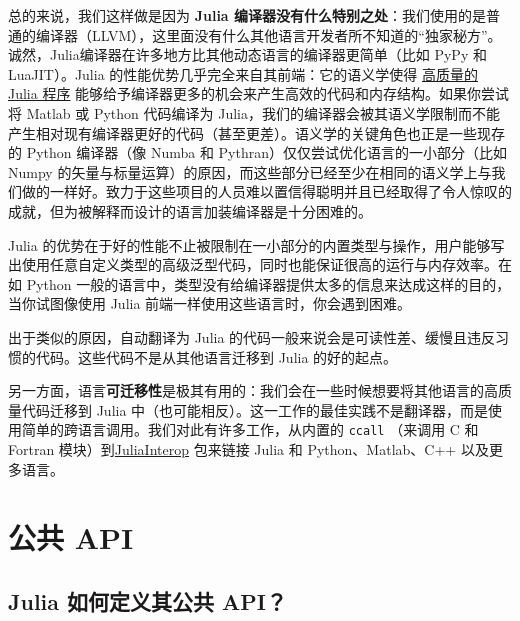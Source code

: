 总的来说，我们这样做是因为 \textbf{Julia 编译器没有什么特别之处}：我们使用的是普通的编译器（LLVM），这里面没有什么其他语言开发者所不知道的“独家秘方”。诚然，Julia编译器在许多地方比其他动态语言的编译器更简单（比如 PyPy 和 LuaJIT）。Julia 的性能优势几乎完全来自其前端：它的语义学使得 \hyperlink{818954303942149020}{高质量的 Julia 程序} 能够给予编译器更多的机会来产生高效的代码和内存结构。如果你尝试将 Matlab 或 Python 代码编译为 Julia，我们的编译器会被其语义学限制而不能产生相对现有编译器更好的代码（甚至更差）。语义学的关键角色也正是一些现存的 Python 编译器（像 Numba 和 Pythran）仅仅尝试优化语言的一小部分（比如 Numpy 的矢量与标量运算）的原因，而这些部分已经至少在相同的语义学上与我们做的一样好。致力于这些项目的人员难以置信得聪明并且已经取得了令人惊叹的成就，但为被解释而设计的语言加装编译器是十分困难的。



Julia 的优势在于好的性能不止被限制在一小部分的内置类型与操作，用户能够写出使用任意自定义类型的高级泛型代码，同时也能保证很高的运行与内存效率。在如 Python 一般的语言中，类型没有给编译器提供太多的信息来达成这样的目的，当你试图像使用 Julia 前端一样使用这些语言时，你会遇到困难。



出于类似的原因，自动翻译为 Julia 的代码一般来说会是可读性差、缓慢且违反习惯的代码。这些代码不是从其他语言迁移到 Julia 的好的起点。



另一方面，语言\textbf{可迁移性}是极其有用的：我们会在一些时候想要将其他语言的高质量代码迁移到 Julia 中（也可能相反）。这一工作的最佳实践不是翻译器，而是使用简单的跨语言调用。我们对此有许多工作，从内置的 \texttt{ccall} （来调用 C 和 Fortran 模块）到\href{https://github.com/JuliaInterop}{JuliaInterop} 包来链接 Julia 和 Python、Matlab、C++ 以及更多语言。



\hypertarget{13920778722662354139}{}


\section{公共 API}



\hypertarget{8601842790836713122}{}


\subsection{Julia 如何定义其公共 API？}



